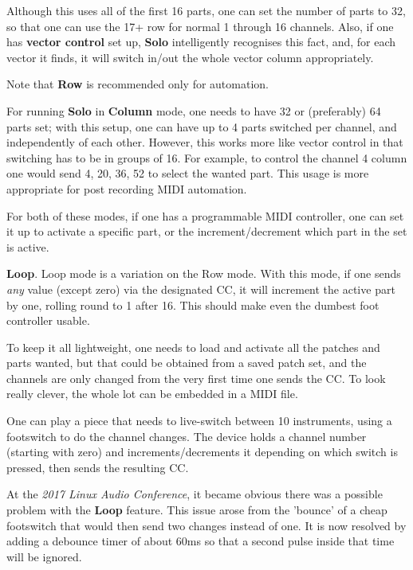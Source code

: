    Although this uses all of the first 16 parts, one can set the number of
   parts to 32, so that one can use the 17+ row for normal 1 through 16
   channels. Also, if one has \textbf{vector control} set up, \textbf{Solo}
   intelligently recognises this fact, and, for each vector it finds, it will
   switch in/out the whole vector column appropriately.

   Note that \textbf{Row} is recommended only for automation.

   For running \textbf{Solo} in \textbf{Column} mode, one needs to have 32 or
   (preferably) 64 parts set; with this setup, one can have up to 4 parts
   switched per channel, and independently of each other. However, this works
   more like vector control in that switching has to be in groups of 16. For
   example, to control the channel 4 column one would send 4, 20, 36, 52 to
   select the wanted part. This usage is more appropriate for post recording
   MIDI automation.

   For both of these modes, if one has a programmable MIDI controller, one can
   set it up to activate a specific part, or the increment/decrement which part
   in the set is active.

   \textbf{Loop}.  Loop mode is a variation on the Row mode.
   With this mode, if one sends \textsl{any} value (except zero)
   via the designated CC,
   it will increment the active part by one, rolling round to 1 after 16.
   This should make even the dumbest foot controller usable.

   To keep it all lightweight, one needs to load and activate all the patches
   and parts wanted, but that could be obtained from a saved patch set, and the
   channels are only changed from the very first time one sends the CC.  To look
   really clever, the whole lot can be embedded in a MIDI file.

   One can play a piece that needs to live-switch between 10 instruments, using
   a footswitch to do the channel changes. The device holds a channel
   number (starting with zero) and increments/decrements it depending on which
   switch is pressed, then sends the resulting CC.

   At the \textsl{2017 Linux Audio Conference},
   it became obvious there was a possible problem with the \textbf{Loop}
   feature. This issue arose from the 'bounce' of a cheap footswitch that would
   then send two changes instead of one. It is now resolved by adding a
   debounce timer of about 60ms so that a second pulse inside that time will be
   ignored.

